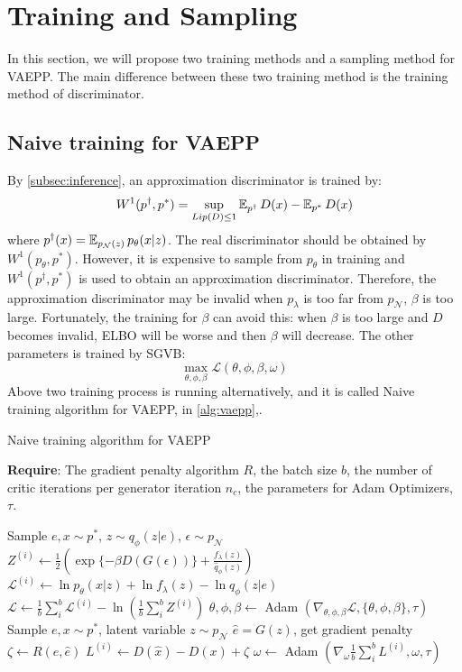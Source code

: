 \section{Training and Sampling}\label{sec:vaepp}
In this section, we will propose two training methods and a sampling method for VAEPP. The main difference between these two training method is the training method of discriminator. 

\subsection{Naive training for VAEPP} \label{subsec:naive_vaepp}
By \cref{subsec:inference}, an approximation discriminator is trained by:
\begin{equation*}
	W^1(p^\dag, p^*) = \sup_{Lip(D) \leq 1} \operatorname{\mathbb{E}}_{p^\dag} D(x) - \operatorname{\mathbb{E}}_{p^*} D(x)
\end{equation*} 
where $p^\dag(x) = \operatorname{\mathbb{E}}_{p_\mathcal{N}(z)} p_\theta(x|z)$. The real discriminator should be obtained by $W^1(p_\theta, p^*)$. However, it is expensive to sample from $p_\theta$ in training and $W^1(p^\dag, p^*)$ is used to obtain an approximation discriminator. Therefore, the approximation discriminator may be invalid when $p_\lambda$ is too far from $p_\mathcal{N}$, \IE $\beta$ is too large. Fortunately, the training for $\beta$ can avoid this: when $\beta$ is too large and $D$ becomes invalid, ELBO will be worse and then $\beta$ will decrease. The other parameters is trained by SGVB:
\begin{equation*}
	\max_{\theta, \phi, \beta} \mathcal{L}(\theta, \phi, \beta, \omega)
\end{equation*}
Above two training process is running alternatively, and it is called Naive training algorithm for VAEPP, in \cref{alg:vaepp},. 
\begin{algorithm}[tb]
\caption{Naive training algorithm for VAEPP}
\label{alg:vaepp}
\textbf{Require}: The gradient penalty algorithm $R$, the batch size $b$, the number of critic iterations per generator iteration $n_c$, the parameters for Adam Optimizers, $\tau$. 

\begin{algorithmic}[1] %
\STATE Sample $e, x \sim p^*$, $z \sim q_\phi(z|e)$, $\epsilon \sim p_\mathcal{N}$
\STATE $Z^{(i)} \gets \frac{1}{2}(\exp\{-\beta D(G(\epsilon))\} + \frac{f_\lambda(z)}{\hat{q}_\phi(z)})$
\STATE $\mathcal{L}^{(i)} \gets \ln p_\theta(x|z) + \ln f_\lambda(z) - \ln q_\phi(z|e)$
\ENDFOR
\STATE $\mathcal{L} \gets \frac{1}{b}\sum_{i}^b \mathcal{L}^{(i)} - \ln (\frac{1}{b}\sum_{i}^b Z^{(i)})$
\STATE $\theta, \phi, \beta \gets $ Adam $(\nabla_{\theta, \phi, \beta} \mathcal{L}, \{\theta, \phi, \beta\}, \tau)$
\ENDFOR
{}
\STATE Sample $e, x \sim p^*$, latent variable $z \sim p_\mathcal{N}$
\STATE	$\hat{e} = G(z)$, get gradient penalty $\zeta \gets R(e, \hat{e})$
\STATE $L^{(i)} \gets D(\hat{x}) - D(x) + \zeta$
\ENDFOR
\STATE $\omega \gets $ Adam $(\nabla_{\omega} \frac{1}{b}\sum_{i}^b L^{(i)}, \omega, \tau)$
\ENDWHILE
\end{algorithmic}
\end{algorithm}

